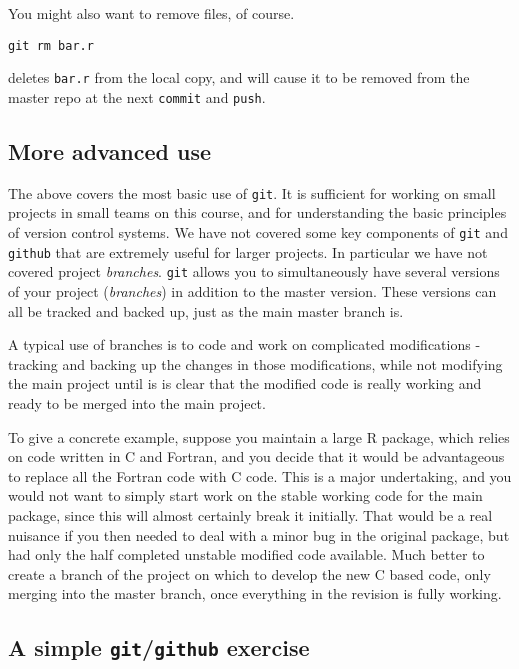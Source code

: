 \documentclass[10pt] {article}
\theoremstyle{definition}
\begin{document}
You might also want to remove files, of course. 
\begin{lstlisting}
git rm bar.r
\end{lstlisting}
deletes {\tt bar.r} from the local copy, and will cause it to be removed from the master repo at the next {\tt commit} and {\tt push}. 

\subsection{More advanced use}

The above covers the most basic use of {\tt git}. It is sufficient for working on small projects in small teams on this course, and for understanding the basic principles of version control systems. We have not covered some key components of  
{\tt git} and {\tt github} that are extremely useful for larger projects. In particular we have not covered project {\em branches}. {\tt git} allows you to simultaneously have several versions of your project ({\em  branches}) in addition to the master version. These versions can all be tracked and backed up, just as the main master branch is. 

A typical use of branches is to code and work on complicated modifications - tracking and backing up the changes in those modifications, while not modifying the main project until is is clear that the modified code is really working and ready to be merged into the main project. 

To give a concrete example, suppose you maintain a large R package, which relies on code written in C and Fortran, and you decide that it would be advantageous to replace all the Fortran code with C code. This is a major undertaking, and you would not want to simply start work on the stable working code for the main package, since this will almost certainly break it initially. That would be a real nuisance if you then needed to deal with a minor bug in the original package, but had only the half completed unstable modified code available. Much better to create a branch of the project on which to develop the new C based code, only merging into the master branch, once everything in the revision is fully working.  


\subsection{A simple {\tt git}/{\tt github} exercise}
\end{document}
